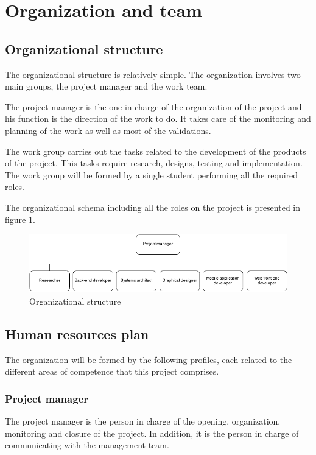 \section{Organization and team}

\subsection{Organizational structure}

The organizational structure is relatively simple. The organization involves two main groups, the project manager and the work team.

The project manager is the one in charge of the organization of the project and his function is the direction of the work to do. It takes care of the monitoring and planning of the work as well as most of the validations.

The work group carries out the tasks related to the development of the products of the project. This tasks require research, designs, testing and implementation. The work group will be formed by a single student performing all the required roles.

The organizational schema including all the roles on the project is presented in figure \ref{fig:organization}.

\begin{figure}[ht]
  \centering
  \includegraphics[width=.7\textwidth]{fig/organization}
  \caption{Organizational structure}
  \label{fig:organization}
\end{figure} 

\subsection{Human resources plan}

The organization will be formed by the following profiles, each related to the different areas of competence that this project comprises.

\subsubsection*{Project manager}

The project manager is the person in charge of the opening, organization, monitoring and closure of the project. In addition, it is the person in charge of communicating with the management team.

